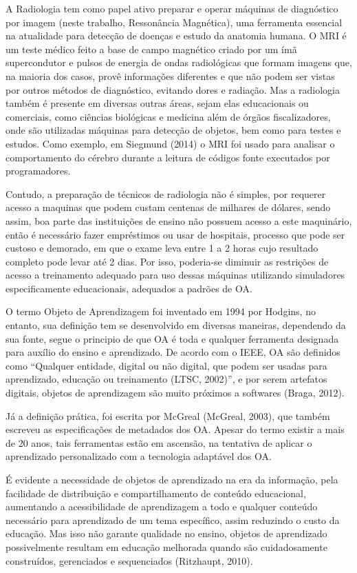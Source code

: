 \documentclass[12pt,openright,oneside,a4paper,english,french,spanish,brazil]{unifil}
\begin{document}
A Radiologia tem como papel ativo preparar e operar máquinas de diagnóstico por imagem (neste trabalho, Ressonância Magnética), uma ferramenta essencial na atualidade para detecção de doenças e estudo da anatomia humana. O MRI é um teste médico feito a base de campo magnético criado por um ímã supercondutor e pulsos de energia de ondas radiológicas que formam imagens que, na maioria dos casos, provê informações diferentes e que não podem ser vistas por outros métodos de diagnóstico, evitando dores e radiação. Mas a radiologia também é presente em diversas outras áreas, sejam elas educacionais ou comerciais, como ciências biológicas e medicina além de órgãos fiscalizadores, onde são utilizadas máquinas para detecção de objetos, bem como para testes e estudos. Como exemplo, em Siegmund (2014) o MRI foi usado para analisar o comportamento do cérebro durante a leitura de códigos fonte executados por programadores. 
\par Contudo, a preparação de técnicos de radiologia não é simples, por requerer acesso a maquinas que podem custam centenas de milhares de dólares, sendo assim, boa parte das instituições de ensino não possuem acesso a este maquinário, então é necessário fazer empréstimos ou usar de hospitais, processo que pode ser custoso e demorado, em que o exame leva entre 1 a 2 horas cujo resultado completo pode levar até 2 dias. Por isso, poderia-se diminuir as restrições de acesso a treinamento adequado para uso dessas máquinas utilizando simuladores especificamente educacionais, adequados a padrões de OA.
\par O termo Objeto de Aprendizagem foi inventado em 1994 por Hodgins, no entanto, sua definição tem se desenvolvido em diversas maneiras, dependendo da sua fonte, segue o principio de que OA é toda e qualquer ferramenta designada para auxílio do ensino e aprendizado. De acordo com o IEEE, OA são definidos como ``Qualquer entidade, digital ou não digital, que podem ser usadas para aprendizado, educação ou treinamento (LTSC, 2002)'', e por serem artefatos digitais, objetos de aprendizagem são muito próximos a softwares (Braga, 2012).
\par Já a definição prática, foi escrita por McGreal (McGreal, 2003), que também escreveu as especificações de metadados dos OA. Apesar do termo existir a mais de 20 anos, tais ferramentas estão em ascensão, na tentativa de aplicar o aprendizado personalizado com a tecnologia adaptável dos OA.
\par É evidente a necessidade de objetos de aprendizado na era da informação, pela facilidade de distribuição e compartilhamento de conteúdo educacional, aumentando a acessibilidade de aprendizagem a todo e qualquer conteúdo necessário para aprendizado de um tema específico, assim reduzindo o custo da educação. Mas isso não garante qualidade no ensino, objetos de aprendizado possivelmente resultam em educação melhorada quando são cuidadosamente construídos, gerenciados e sequenciados (Ritzhaupt, 2010).
\end{document}
